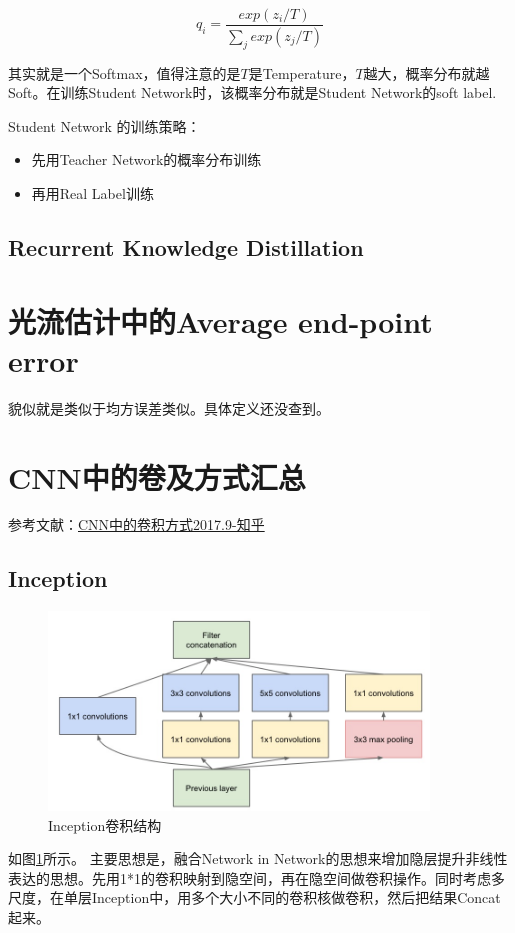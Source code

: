 \begin{displaymath}
q_i = \frac{exp(z_i/T)}{\sum_{j}exp(z_j/T)}
\end{displaymath}

其实就是一个Softmax，值得注意的是$T$是Temperature，$T$越大，概率分布就越Soft。在训练Student Network时，该概率分布就是Student Network的soft label.

Student Network 的训练策略：
\begin{itemize}
\item 先用Teacher Network的概率分布训练
\item 再用Real Label训练
\end{itemize}

\subsection{Recurrent Knowledge Distillation \cite{Silvia2018Recurrent}}

\section{光流估计中的Average end-point error}

貌似就是类似于均方误差类似。具体定义还没查到。

\section{CNN中的卷及方式汇总}

参考文献：\href{https://zhuanlan.zhihu.com/p/29367273}{CNN中的卷积方式2017.9-知乎}

\subsection{Inception}

\begin{figure}[!htbp]
\centering
\includegraphics[width=0.9\textwidth]{DLTips/Inception0.jpg}
\caption{Inception卷积结构}
\label{Inception0}
\end{figure}
如图\ref{Inception0}所示。
主要思想是，融合Network in Network的思想来增加隐层提升非线性表达的思想。先用1*1的卷积映射到隐空间，再在隐空间做卷积操作。同时考虑多尺度，在单层Inception中，用多个大小不同的卷积核做卷积，然后把结果Concat起来。

